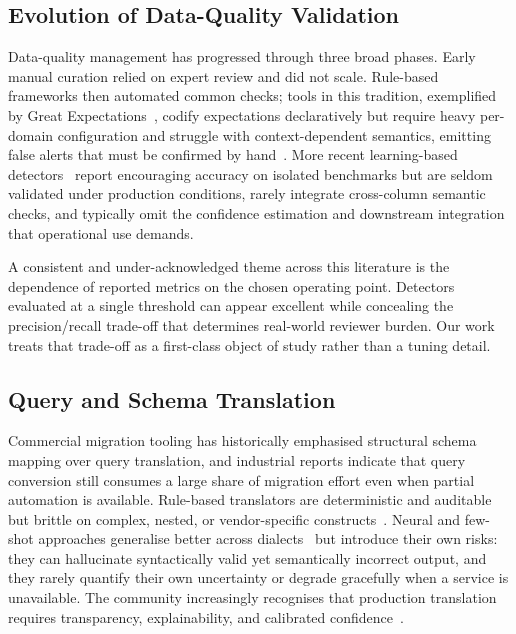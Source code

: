 \documentclass{ieeeaccess}
\begin{document}
\subsection{Evolution of Data-Quality Validation}
Data-quality management has progressed through three broad phases. Early manual curation relied on expert review and did
not scale. Rule-based frameworks then automated common checks; tools in this tradition, exemplified by Great
Expectations~\cite{great_expectations}, codify expectations declaratively but require heavy per-domain configuration and
struggle with context-dependent semantics, emitting false alerts that must be confirmed by hand~\cite{batini2009data}.
More recent learning-based detectors~\cite{pedregosa2011scikit,aggarwal2017outlier} report encouraging accuracy on
isolated benchmarks but are seldom validated under production conditions, rarely integrate cross-column semantic checks,
and typically omit the confidence estimation and downstream integration that operational use demands.

A consistent and under-acknowledged theme across this literature is the dependence of reported metrics on the chosen
operating point. Detectors evaluated at a single threshold can appear excellent while concealing the precision/recall
trade-off that determines real-world reviewer burden. Our work treats that trade-off as a first-class object of study
rather than a tuning detail.

\subsection{Query and Schema Translation}
Commercial migration tooling has historically emphasised structural schema mapping over query translation, and industrial
reports indicate that query conversion still consumes a large share of migration effort even when partial automation is
available. Rule-based translators are deterministic and auditable but brittle on complex, nested, or vendor-specific
constructs~\cite{rahm2001survey}. Neural and few-shot approaches generalise better across dialects~\cite{manning2008introduction}
but introduce their own risks: they can hallucinate syntactically valid yet semantically incorrect output, and they rarely
quantify their own uncertainty or degrade gracefully when a service is unavailable. The community increasingly recognises
that production translation requires transparency, explainability, and calibrated confidence~\cite{ribeiro2016why}.
\end{document}
